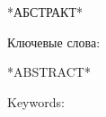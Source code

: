 \documentclass[../diploma.tex]{subfiles}
\begin{document}
*АБСТРАКТ*

\vspace*{\fill}

Ключевые слова: 

\newpage

*ABSTRACT*

\vspace*{\fill}

Keywords:
\end{document}
